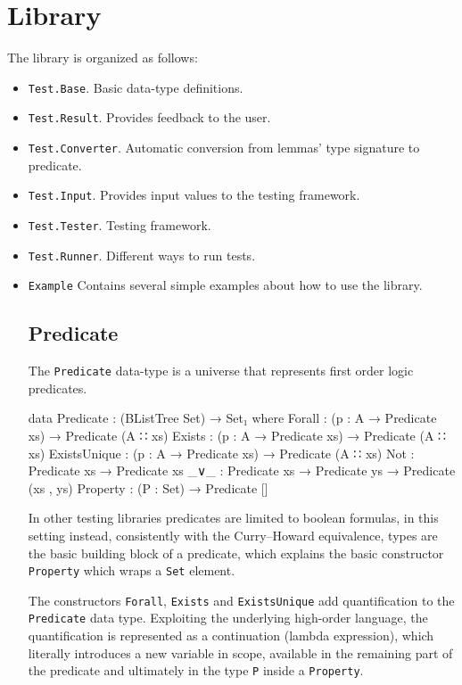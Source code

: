 \documentclass[10pt,a4paper]{article}
\begin{document}
\section{Library}
The library is organized as follows:
\begin{itemize}
	\item \texttt{Test.Base}. Basic data-type definitions.
	\item \texttt{Test.Result}. Provides feedback to the user.
	\item \texttt{Test.Converter}. Automatic conversion from lemmas' type signature to predicate.
	\item \texttt{Test.Input}. Provides input values to the testing framework.
	\item \texttt{Test.Tester}. Testing framework.
	\item \texttt{Test.Runner}. Different ways to run tests.
	\item \texttt{Example} Contains several simple examples about how to use the library.
	
\subsection{Predicate}
\label{sec:predicate}
The \texttt{Predicate} data-type is a universe that represents first order logic predicates.

\begin{code}
data Predicate : (BListTree Set) → Set₁ where
  Forall : (p : A → Predicate xs) → Predicate (A ∷ xs)
  Exists : (p : A → Predicate xs) → Predicate (A ∷ xs)
  ExistsUnique : (p : A → Predicate xs) → Predicate (A ∷ xs)
  Not : Predicate xs → Predicate xs
  _∨_ : Predicate xs → Predicate ys → Predicate (xs , ys)
  Property : (P : Set) → Predicate []
\end{code}

In other testing libraries predicates are limited to boolean formulas, in this setting instead, consistently with the Curry–Howard equivalence, types are the basic building block of a predicate, which explains the basic constructor \texttt{Property} which wraps a \texttt{Set} element.

The constructors \texttt{Forall}, \texttt{Exists} and \texttt{ExistsUnique} add quantification to the \texttt{Predicate} data type.
Exploiting the underlying high-order language, the quantification is represented as a continuation (lambda expression), which literally introduces a new variable in scope, available in the remaining part of the predicate and ultimately in  the type \texttt{P} inside a \texttt{Property}.


\end{itemize}
\end{document}
